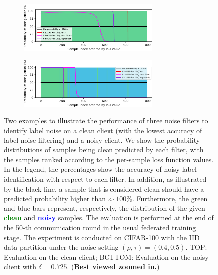 \documentclass[letterpaper]{article} %
\begin{document}
\begin{figure}[t]
    \centering
    \begin{subfigure}{\textwidth}
        \centering
        \includegraphics[width=0.75\textwidth]{figures/identification_performance_clean.pdf}
    \end{subfigure}
    \begin{subfigure}{\textwidth}
        \centering
        \includegraphics[width=0.75\textwidth]{figures/identification_performance_noisy.pdf}
    \end{subfigure}

    \caption{Two examples to illustrate the performance of three noise filters to identify label noise on a clean client (with the lowest accuracy of label noise filtering) and a noisy client. We show the probability distributions of samples being clean predicted by each filter, with the samples ranked according to the per-sample loss function values. In the legend, the percentages show the accuracy of noisy label identification with respect to each filter. In addition, as illustrated by the black line, a sample that is considered clean should have a predicted probability higher than $\kappa\cdot100\%$. Furthermore, the green and blue bars represent, respectively, the distribution of the given \textbf{\textcolor{green}{clean}} and \textbf{\textcolor{blue}{noisy}} samples. The evaluation is performed at the end of the 50-th communication round in the usual federated training stage. The experiment is conducted on CIFAR-100 with the IID data partition under the noise setting $(\rho, \tau)=(0.4, 0.5)$. TOP: Evaluation on the clean client; BOTTOM: Evaluation on the noisy client with $\delta=0.725$. (\textbf{Best viewed zoomed in.})}
    \label{Figure:Performance-On-Different-Filter}
\end{figure}
\end{document}
